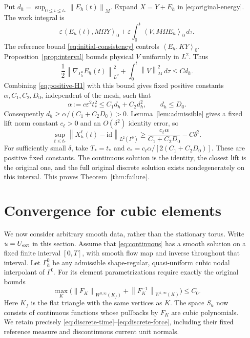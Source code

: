\documentclass[11pt,a4paper]{article}
\numberwithin{equation}{section}
\theoremstyle{remark}
\newcommand{\id}{\mathrm{id}}
\newcommand{\norm}[1]{\left\lVert #1\right\rVert}
\newcommand{\ip}[2]{\left\langle #1,#2\right\rangle_0}
\begin{document}
Put \(d_h=\sup_{0\leq t\leq t_*}\norm{E_h(t)}_M\).
Expand \(X=Y+E_h\) in \eqref{eq:original-energy}. The work integral is
\[
 \varepsilon\ip{E_h(t)}{M\Omega Y}
          +\varepsilon\int_0^t\ip V{M\Omega E_h}\,d\tau .
\]
The reference bound \eqref{eq:initial-consistency} controls
\(\ip{E_h}{KY}\). Proposition~\ref{prop:interval} bounds
physical \(V\) uniformly in \(L^2\). Thus
\begin{equation}\label{eq:gradient-from-map}
 \frac12\norm{\nabla_{\Gamma_h^0}E_h(t)}_{L^2}^2
                   +\int_0^t\norm V_M^2\,d\tau\leq C d_h .
\end{equation}
Combining \eqref{eq:positive-H1} with this bound gives fixed
positive constants \(\alpha,C_1,C_2,D_0\), independent of the mesh,
such that
\[
 \alpha:=c\varepsilon^2t_*^2\leq C_1d_h+C_2d_h^2,\qquad
                              d_h\leq D_0 .
\]
Consequently \(d_h\geq\alpha/(C_1+C_2D_0)>0\).
Lemma~\ref{lem:admissible} gives a fixed lift norm constant \(c_\ell>0\)
and an \(O(\delta^2)\) identity error, so
\[
 \sup_{t\leq t_*}\norm{X_h^\ell(t)-\id}_{L^2(\Gamma^0)}
           \geq \frac{c_\ell\alpha}{C_1+C_2D_0}-C\delta^2 .
\]
For sufficiently small \(\delta\), take
\(T_*=t_*\) and
\(c_*=c_\ell\alpha/[2(C_1+C_2D_0)]\).
These are positive fixed constants. The continuous solution is
the identity, the closest lift is the original one, and the full
original discrete solution exists nondegenerately on this interval.
This proves Theorem~\ref{thm:failure}.

\section{Convergence for cubic elements}\label{sec:cubic}

We now consider arbitrary smooth data, rather than the stationary torus.
Write \(u=U_{\rm ext}\) in this section. Assume that
\eqref{eq:continuous} has a smooth solution on a fixed finite interval
\([0,T]\), with smooth flow map and inverse throughout that interval.
Let \(\Gamma_h^0\) be any admissible shape-regular, quasi-uniform cubic
nodal interpolant of \(\Gamma^0\). For its element parametrizations require
exactly the original bounds
\begin{equation}\label{eq:cubic-mesh}
 \max_K\bigl(\norm{F_K}_{W^{3,\infty}(K_f)}
       +\norm{F_K^{-1}}_{W^{1,\infty}(K)}\bigr)\leq C_0 .
\end{equation}
Here \(K_f\) is the flat triangle with the same vertices as \(K\).
The space \(S_h\) now consists of continuous functions whose pullbacks
by \(F_K\) are cubic polynomials. We retain precisely
\eqref{eq:discrete-time}--\eqref{eq:discrete-force}, including their
fixed reference measure and discontinuous current unit normals.
\end{document}
